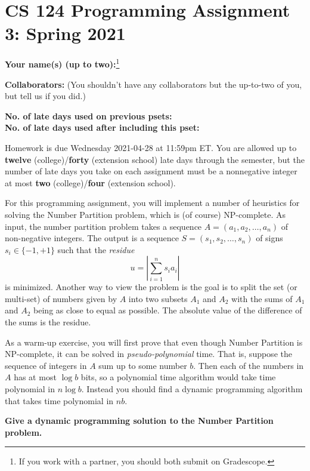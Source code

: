 \documentclass[11pt]{article}
\begin{document}
	
	\section*{CS 124 Programming Assignment 3: Spring 2021}
 		
	\textbf{Your name(s) (up to two):}\footnote{If you work with a partner, you should both submit on Gradescope.}
		
	\textbf{Collaborators:} (You shouldn't have any collaborators but the up-to-two of you, but tell us if you did.)

	\textbf{No. of late days used on previous psets: }\\
	\textbf{No. of late days used after including this pset: }

Homework is due Wednesday 2021-04-28 at 11:59pm ET. You are allowed up to {\bf twelve} (college)/{\bf forty} (extension school) late days through the semester, but the number of late days you take on each assignment must be a nonnegative integer at most {\bf two} (college)/{\bf four} (extension school).

For this programming assignment, you will implement a number of
heuristics for solving the {\sc Number Partition} problem, which is
(of course) NP-complete.  As input, the number partition problem
takes a sequence $A = (a_1,a_2,\ldots,a_n)$ of non-negative integers.  The output is a sequence $S = (s_1,s_2,\ldots,s_n)$ 
of signs $s_i \in \{-1,+1\}$ such that the {\em residue}
$$u = \left | \sum_{i=1}^n s_i a_i \right |$$ is minimized.  Another
way to view the problem is the goal is to split the set (or multi-set)
of numbers given by $A$ into two subsets $A_1$ and $A_2$ with the sums
of $A_1$ and $A_2$ being as close to equal as possible.
The absolute value of the difference of the sums is the
residue.

As a warm-up exercise, you will first prove that even though Number
Partition is NP-complete, it can be solved in {\em pseudo-polynomial} time.
That is, suppose the sequence of integers in $A$ sum up to some number
$b$.  Then each of the numbers in $A$ has at most $\log b$ bits,
so a polynomial time algorithm would take time polynomial in 
$n \log b$.  Instead you should find a dynamic programming algorithm
that takes time polynomial in $nb$.  

\smallskip 
{\bf Give a dynamic programming solution to the Number Partition
problem.}
\smallskip 
\end{document}
